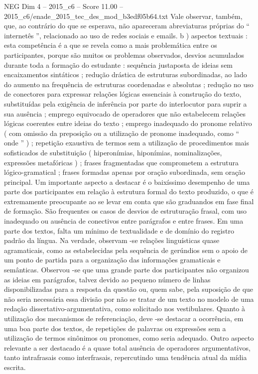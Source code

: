 \begin{textsample}{NEG Dim 4 – 2015\_c6 – Score 11.00 – 2015\_c6/enade\_2015\_tec\_des\_mod\_b3edf05b64.txt}
Vale observar, também, que, ao contrário do que se esperava, não apareceram abreviaturas próprias do “ internetês ”, relacionado ao uso de redes sociais e emails. b ) aspectos textuais : esta competência é a que se revela como a mais problemática entre os participantes, porque são muitos os problemas observados, desvios acumulados durante toda a formação do estudante : sequência justaposta de ideias sem encaixamentos sintáticos ; redução drástica de estruturas subordinadas, ao lado do aumento na frequência de estruturas coordenadas e absolutas ; redução no uso de conectores para expressar relações lógicas essenciais à construção do texto, substituídas pela exigência de inferência por parte do interlocutor para suprir a sua ausência ; emprego equivocado de operadores que não estabelecem relações lógicas coerentes entre ideias do texto ; emprego inadequado do pronome relativo ( com omissão da preposição ou a utilização de pronome inadequado, como “ onde ” ) ; repetição exaustiva de termos sem a utilização de procedimentos mais sofisticados de substituição ( hiperonímias, hiponímias, nominalizações, expressões metafóricas ) ; frases fragmentadas que comprometem a estrutura lógico-gramatical ; frases formadas apenas por oração subordinada, sem oração principal.
Um importante aspecto a destacar é o baixíssimo desempenho de uma parte dos participantes em relação à estrutura formal do texto produzido, o que é extremamente preocupante ao se levar em conta que são graduandos em fase final de formação.
São frequentes os casos de desvios de estruturação frasal, com uso inadequado ou ausência de conectivos entre parágrafos e entre frases.
Em uma parte dos textos, falta um mínimo de textualidade e de domínio do registro padrão da língua.
Na verdade, observam -se relações linguísticas quase agramaticais, como as estabelecidas pela sequência de gerúndios sem o apoio de um ponto de partida para a organização das informações gramaticais e semânticas.
Observou -se que uma grande parte dos participantes não organizou as ideias em parágrafos, talvez devido ao pequeno número de linhas disponibilizadas para a resposta da questão ou, quem sabe, pela suposição de que não seria necessária essa divisão por não se tratar de um texto no modelo de uma redação dissertativo-argumentativa, como solicitado nos vestibulares.
Quanto à utilização dos mecanismos de referenciação, deve -se destacar a ocorrência, em uma boa parte dos textos, de repetições de palavras ou expressões sem a utilização de termos sinônimos ou pronomes, como seria adequado.
Outro aspecto relevante a ser destacado é a quase total ausência de operadores argumentativos, tanto intrafrasais como interfrasais, repercutindo uma tendência atual da mídia escrita.

\end{textsample}
